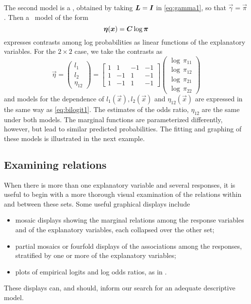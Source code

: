 The second model is a , obtained by taking
$\bm{L}=\bm{I}$ in \eqref{eq:gamma1}, so that $\vec{\gamma} = \vec{\pi}$.
Then a \loglin\ model of the form
\begin{equation*}
\bm{\eta } ( \bm{x} ) = \bm{C} \log \bm{\pi}
\end{equation*}
expresses contrasts among log probabilities as linear functions of
the explanatory variables.  For the $2 \times 2$ case, we take the
contrasts as
\begin{equation}\label{eq:eta3}
 \vec{\eta }=\left(
 \begin{array}{c}
  l_1 \\
  l_2 \\
  \eta _{12}
 \end{array}
 \right) =\left[
 \begin{array}{rrrr}
  1 & 1 & -1 & -1 \\
  1 & -1 & 1 & -1 \\
  1 & -1 & 1 & -1
 \end{array}
\right] \left(
 \begin{array}{c}
  \log \,\pi _{11} \\
  \log \,\pi _{12} \\
  \log \,\pi _{21} \\
  \log \,\pi _{22}
 \end{array}
\right)
\end{equation}
and models for the dependence of $l _1\left( \vec{x}%
\right) , l _2\left( \vec{x}\right) $ and $\eta _{12}\left( \vec{x}%
\right) $ are expressed in the same way as \eqref{eq:bilogit1}.
The estimates of the odds ratio, $\eta _{12}$ are the same under both
models.  The marginal functions are parameterized differently, however,
but lead to similar predicted probabilities.
The fitting and graphing of these models is illustrated in the
next example.



\subsection{Examining relations}
When there is more than one explanatory variable and several responses,
it is useful to begin with a more thorough
visual examination of the relations within and between these sets.
Some useful graphical displays include
\begin{itemize}
\item mosaic displays showing the marginal relations among the response variables
and of the explanatory variables, each collapsed over the other set;
\item partial mosaics or fourfold displays of the associations among
the responses, stratified by one or more of the explanatory variables;
\item plots of empirical logits and log odds ratios, as in .
\end{itemize}
These displays can, and should, inform our search for an adequate
descriptive model.

